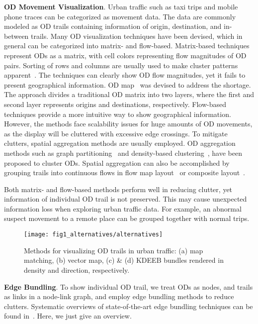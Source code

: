 \noindent
\textbf{OD Movement Visualization}.
Urban traffic such as taxi trips and mobile phone traces can be categorized as movement data.
The data are commonly modeled as OD trails containing information of origin, destination, and in-between trails.
Many OD visualization techniques have been devised, which in general can be categorized into matrix- and flow-based. 
Matrix-based techniques represent ODs as a matrix, with cell colors representing flow magnitudes of OD pairs.
Sorting of rows and columns are usually used to make cluster patterns apparent~\cite{wilkinson2009history}.
The techniques can clearly show OD flow magnitudes, yet it fails to present geographical information. 
OD map~\cite{wood2010visualisation} was devised to address the shortage.
The approach divides a traditional OD matrix into two layers, where the first and second layer represents origins and destinations, respectively.
Flow-based techniques provide a more intuitive way to show geographical information.
However, the methods face scalability issues for huge amounts of OD movements, as the display will be cluttered with excessive edge crossings.
To mitigate clutters, spatial aggregation methods are usually employed.
OD aggregation methods such as graph partitioning~\cite{guo2009flow} and density-based clustering~\cite{von2016mobilitygraphs}, have been proposed to cluster ODs.
Spatial aggregation can also be accomplished by grouping trails into continuous flows in flow map layout~\cite{phan2005flow} or composite layout~\cite{cornel_2016_composite}.

Both matrix- and flow-based methods perform well in reducing clutter, yet information of individual OD trail is not preserved.
This may cause unexpected information loss when exploring urban traffic data.
For example, an abnormal suspect movement to a remote place can be grouped together with normal trips.

\begin{figure}[t] 
	\centering
	\texttt{[image: fig1\_alternatives/alternatives]}
	\vspace{-6mm}
	\caption{Methods for visualizing OD trails in urban traffic: (a) map matching, (b) vector map, (c) \& (d) KDEEB bundles rendered in density and direction, respectively.}
	\label{fig:alternatives}
	\vspace{-5mm}
\end{figure}

\noindent
\textbf{Edge Bundling}.
To show individual OD trail, we treat ODs as nodes, and trails as links in a node-link graph, and employ edge bundling methods to reduce clutters.
Systematic overviews of state-of-the-art edge bundling techniques can be found in~\cite{zhou2013edge, lhuillier2017state}.
Here, we just give an overview.

